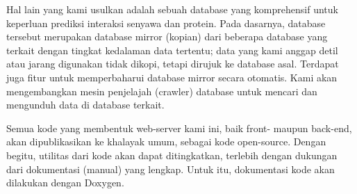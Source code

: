 Hal lain yang kami usulkan adalah sebuah database yang komprehensif untuk keperluan prediksi interaksi senyawa dan protein.
Pada dasarnya, database tersebut merupakan database mirror (kopian) dari beberapa database yang terkait dengan tingkat kedalaman data tertentu;
data yang kami anggap detil atau jarang digunakan tidak dikopi, tetapi dirujuk ke database asal.
Terdapat juga fitur untuk memperbaharui database mirror secara otomatis.
Kami akan mengembangkan mesin penjelajah (crawler) database untuk mencari dan mengunduh data di database terkait.

Semua kode yang membentuk web-server kami ini, baik front- maupun back-end, akan dipublikasikan ke khalayak umum, sebagai kode open-source.
Dengan begitu, utilitas dari kode akan dapat ditingkatkan, terlebih dengan dukungan dari dokumentasi (manual) yang lengkap.
Untuk itu, dokumentasi kode akan dilakukan dengan Doxygen.%




